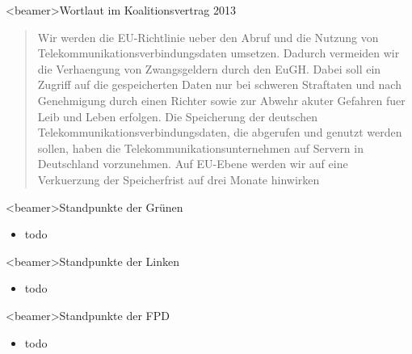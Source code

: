     \begin{frame}<beamer>{Wortlaut im Koalitionsvertrag 2013}
             \begin{quote}
Wir werden die EU-Richtlinie ueber den Abruf und die Nutzung von Telekommunikationsverbindungsdaten umsetzen. Dadurch vermeiden wir die Verhaengung von Zwangsgeldern durch den EuGH. Dabei soll ein Zugriff auf die gespeicherten Daten nur bei schweren Straftaten und nach Genehmigung durch einen Richter sowie zur Abwehr akuter Gefahren fuer Leib und Leben erfolgen. Die Speicherung der deutschen Telekommunikationsverbindungsdaten, die abgerufen und genutzt werden sollen, haben die Telekommunikationsunternehmen auf Servern in Deutschland vorzunehmen. Auf EU-Ebene werden wir auf eine Verkuerzung der Speicherfrist auf drei Monate hinwirken
\end{quote}
   \end{frame}
     
    \begin{frame}<beamer>{Standpunkte der Grünen}
       \begin{itemize}
        \item todo
      \end{itemize}
    \end{frame}

    \begin{frame}<beamer>{Standpunkte der Linken}
       \begin{itemize}
        \item todo
  
      \end{itemize}
    \end{frame}

    \begin{frame}<beamer>{Standpunkte der FPD}
       \begin{itemize}
        \item todo
  
      \end{itemize}
    \end{frame}
